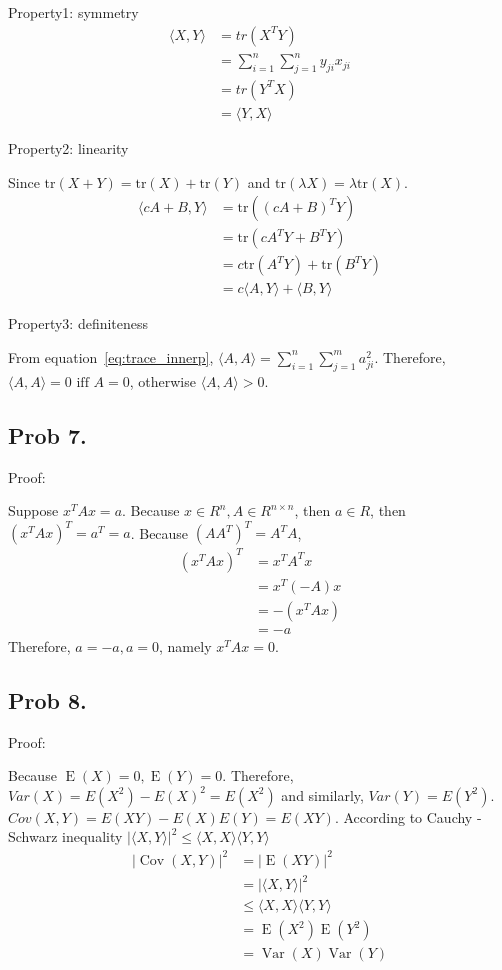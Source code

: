 \documentclass[10pt,a4paper]{article}
\begin{document}
Property1: symmetry
\begin{align*}
	\langle X, Y\rangle&=tr(X^TY)\\
	&=\sum_{i=1}^{n}\sum_{j=1}^{n}{y_{ji}x_{ji}}\\
	&=tr(Y^TX)\\
	&=\langle Y,X\rangle
\end{align*}

Property2: linearity

Since $\text{tr}(X+Y)=\text{tr}(X)+\text{tr}(Y)$ and $ \text{tr}(\lambda X)=\lambda\text{tr}(X)$.
\begin{align*}
\langle cA+B, Y\rangle&=\text{tr}((cA+B)^TY)\\
&=\text{tr}(cA^TY+B^TY)\\
&=c\text{tr}(A^TY)+\text{tr}(B^TY)\\
&=c\langle A, Y\rangle + \langle B, Y\rangle
\end{align*}

Property3: definiteness

From equation~\ref{eq:trace_innerp}, $\langle A, A\rangle=\sum_{i=1}^{n}\sum_{j=1}^{m}{a_{ji}^2}$. Therefore, $\langle A, A\rangle=0 \text{ iff } A=0$, otherwise $\langle A, A\rangle>0$.


\subsection{Prob 7.}
Proof:

Suppose $x^TAx = a$. Because $x\in R^n, A\in R^{n\times n}$, then $ a \in R$, then $(x^TAx)^T = a^T=a$. Because $(AA^T)^T=A^TA$,
\begin{align*}
(x^TAx)^T &= x^TA^Tx\\
&=x^T(-A)x\\
&= -(x^TAx)\\
&= -a
\end{align*}
Therefore, $a = -a, a=0$, namely $x^TAx=0$.

\subsection{Prob 8.}
Proof:

Because $\operatorname{E}(X)=0, \operatorname{E}(Y)=0$. Therefore,  $Var(X) = E(X^2)-E(X)^2=E(X^2)$ and similarly, $Var(Y) =E(Y^2)$. $Cov(X,Y)=E(XY)-E(X)E(Y)=E(XY)$. According to Cauchy - Schwarz inequality $| \langle X, Y\rangle |^2 \leq \langle X, X \rangle \langle Y , Y \rangle$
\begin{align*}
|\operatorname{Cov}(X,Y)|^2 &= |\operatorname{E}(XY)|^2 \\
&= | \langle X, Y\rangle |^2\\
&\leq \langle X, X \rangle \langle Y , Y \rangle \\
& = \operatorname{E}( X^2 ) \operatorname{E}( Y^2 ) \\
& = \operatorname{Var}(X) \operatorname{Var}(Y)
\end{align*}
\end{document}
